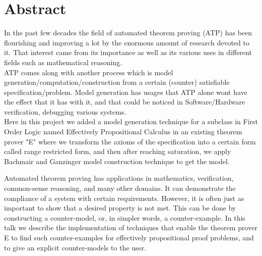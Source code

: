 \chapter*{Abstract}
\label{chap:abstract}

In the past few decades the field of automated theorem proving (ATP) has been flourishing and improving a lot by the enormous amount of research devoted to it. That interest came from its importance as well as its various uses in different fields such as mathematical reasoning.
\\
ATP comes along with another process which is model generation/computation/construction from a certain (counter) satisfiable specification/problem. Model generation has usages that ATP alone wont have the effect that it has with it, and that could be noticed in Software/Hardware verification, debugging various systems.
\\
Here in this project we added a model generation technique for a subclass in First Order Logic named Effectively Propositional Calculus in an existing theorem prover "E" where we transform the axioms of the specification into a certain form called range restricted form, and then after reaching saturation, we apply Bachmair and Ganzinger model construction technique to get the model.


Automated theorem proving has applications in mathematics, verification, common-sense reasoning, and many other domains. It can demonstrate the compliance of a system with certain requirements. However, it is often just as important to show that a desired property is not met. This can be done by constructing a counter-model, or, in simpler words, a counter-example. In this talk we describe the implementation of techniques that enable the theorem prover E to find such counter-examples for effectively propositional proof problems, and to give an explicit counter-models to the user.